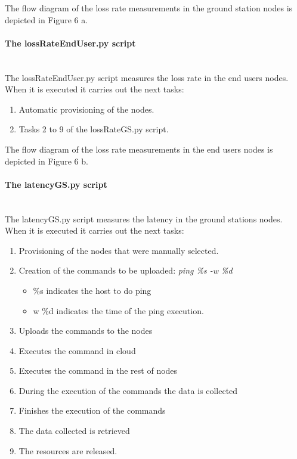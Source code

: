 The flow diagram of the loss rate measurements in the ground station nodes is
depicted in Figure 6 a.

\paragraph{The lossRateEndUser.py script}~\\

The lossRateEndUser.py  script measures the loss rate in the end users
nodes. When it is executed it carries out the next tasks:
\begin{enumerate}
\item Automatic provisioning of the nodes.
\item Tasks 2 to 9 of the lossRateGS.py script.
\end{enumerate}
The flow diagram of the loss rate measurements in the end users nodes is
depicted in Figure 6 b.

\paragraph{The latencyGS.py script}~\\

The latencyGS.py  script measures the latency  in the ground stations
nodes. When it is executed it carries out the next tasks:
\begin{enumerate}

\item Provisioning of the nodes that were manually selected.
\item Creation of the commands to be uploaded:
\emph{ping \%s -w \%d}
\begin{itemize}
\item \%s indicates the host to do ping
\item w \%d indicates the time of the ping execution.
\end{itemize}
\item Uploads the commands to the nodes
\item Executes the command in cloud
\item Executes the command in the rest of nodes
\item During the execution of the commands the data is collected
\item Finishes the execution of the commands
\item The data collected is retrieved
\item The resources are released.
\end{enumerate}

